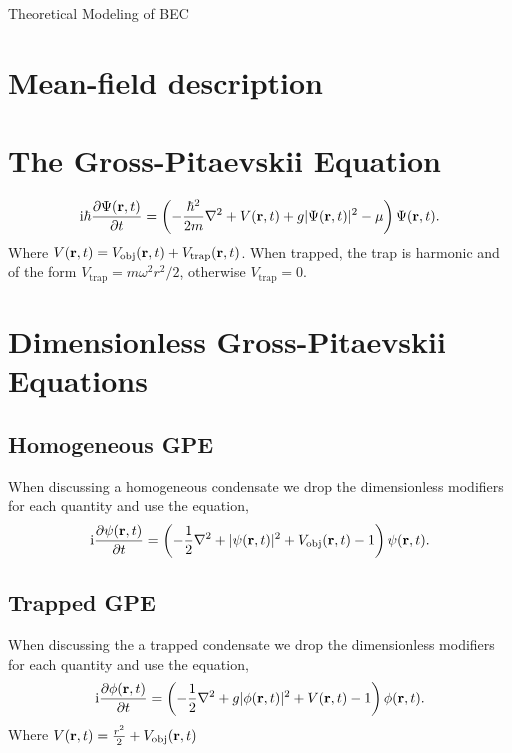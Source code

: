 \begin{chapter}{\label{cha:theoretical_model}Theoretical Modeling of BEC}
\section{\label{section:meanfield} Mean-field description}
\section{\label{section:gpe} The Gross-Pitaevskii Equation}
	\begin{equation}
	\mathrm{i} \hbar \frac{\partial\Psi({\bf r},t)}{\partial t} = \left(-\frac{\hbar^2}{2m}\nabla^2 + V({\bf r},t) + g|\Psi({\bf r},t)|^2 - \mu \right) \Psi({\bf r},t).
	\label{eq:gpe}
	\end{equation}
	Where $V({\bf r},t) = V_{\mathrm{obj}}({\bf r},t) + V_{\mathrm{trap}}({\bf r},t)$. When trapped, the trap is harmonic and of the form $V_{\mathrm{trap}}=m\omega^2r^2/2$, otherwise $V_{\mathrm{trap}}=0$.
\section{\label{section:gpedimless} Dimensionless Gross-Pitaevskii Equations}
	\subsection{\label{section:gpedimlesshomg} Homogeneous GPE}
		When discussing a homogeneous condensate we drop the dimensionless modifiers for each quantity and use the equation,
		\begin{equation}\label{eq:dimgpehomg}
		\mathrm{i}\frac{\partial\psi({\bf r},t)}{\partial t} = \left( -\frac{1}{2}\nabla^2 + |\psi({\bf r},t)|^2 + V_{\mathrm{obj}}({\bf r},t) - 1 \right) \psi({\bf r},t).
		\end{equation}
	\subsection{\label{section:gpedimlesstrap} Trapped GPE}
		When discussing the a trapped condensate we drop the dimensionless modifiers for each quantity and use the equation,
		\begin{equation}\label{eq:dimgpetrapped}
		\mathrm{i}\frac{\partial\phi({\bf r},t)}{\partial t} = \left( -\frac{1}{2}\nabla^2 + g|\phi({\bf r},t)|^2 + V({\bf r},t) - 1 \right) \phi({\bf r},t).
		\end{equation}
		Where $V({\bf r},t) = \frac{r^2}{2} + V_{\mathrm{obj}}({\bf r},t)$

\end{chapter}
